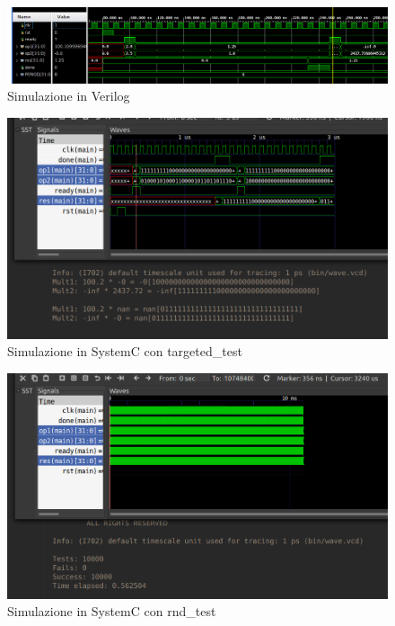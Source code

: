 \documentclass[]{IEEEtran}
\begin{document}
\begin{figure}[bt]
    \centering
    \includegraphics[width=\textwidth]{figures/simulazione1}
    \caption{Simulazione in Verilog}
    \label{fig:SIM1}
\end{figure}

\begin{figure}[bt]
    \centering
    \includegraphics[width=\textwidth]{figures/simulazione2}
    \caption{Simulazione in SystemC con targeted\_test}
    \label{fig:SIM2}
\end{figure}

\begin{figure}[bt]
    \centering
    \includegraphics[width=\textwidth]{figures/simulazione3}
    \caption{Simulazione in SystemC con rnd\_test}
    \label{fig:SIM3}
\end{figure}
\end{document}
